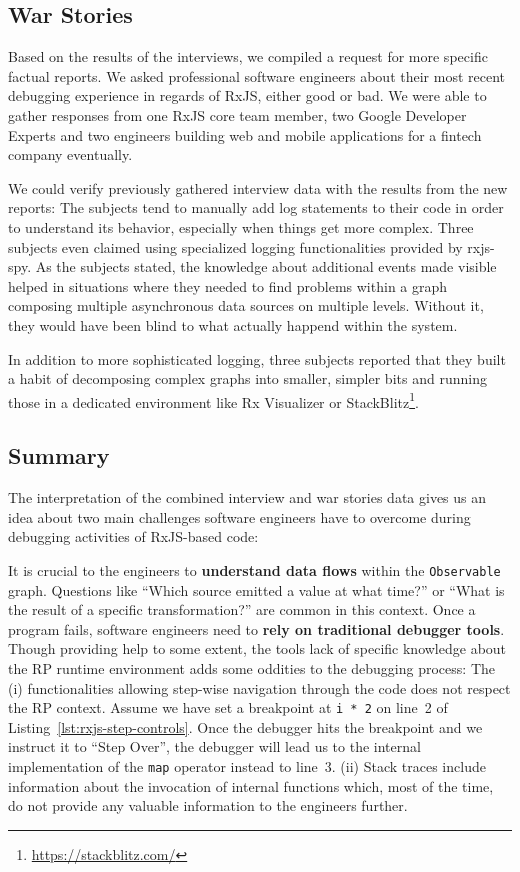 \documentclass[12pt,a4paper]{article}
\begin{document}
\subsection{War Stories}

Based on the results of the interviews, we compiled a request for more specific factual reports. We asked professional software engineers about their most recent debugging experience in regards of RxJS, either good or bad. We were able to gather responses from one RxJS core team member, two Google Developer Experts and two engineers building web and mobile applications for a fintech company eventually.

We could verify previously gathered interview data with the results from the new reports: The subjects tend to manually add log statements to their code in order to understand its behavior, especially when things get more complex. Three subjects even claimed using specialized logging functionalities provided by rxjs-spy\cite{rxjsspy}. As the subjects stated, the knowledge about additional events made visible helped in situations where they needed to find problems within a graph composing multiple asynchronous data sources on multiple levels. Without it, they would have been blind to what actually happend within the system.

In addition to more sophisticated logging, three subjects reported that they built a habit of decomposing complex graphs into smaller, simpler bits and running those in a dedicated environment like Rx Visualizer\cite{rxviz} or StackBlitz\footnote{\url{https://stackblitz.com/}}.

\subsection{Summary}

The interpretation of the combined interview and war stories data gives us an idea about two main challenges software engineers have to overcome during debugging activities of RxJS-based code:

It is crucial to the engineers to \textbf{understand data flows}  within the \texttt{Observable} graph. Questions like ``Which source emitted a value at what time?'' or ``What is the result of a specific transformation?'' are common in this context. Once a program fails, software engineers need to \textbf{rely on traditional debugger tools}. Though providing help to some extent, the tools lack of specific knowledge about the RP runtime environment adds some oddities to the debugging process: The (i) functionalities allowing step-wise navigation through the code does not respect the RP context. Assume we have set a breakpoint at \texttt{i * 2} on line~2 of Listing~\ref{lst:rxjs-step-controls}. Once the debugger hits the breakpoint and we instruct it to ``Step Over'', the debugger will lead us to the internal implementation of the \texttt{map} operator instead to line~3. (ii) Stack traces include information about the invocation of internal functions which, most of the time, do not provide any valuable information to the engineers further.
\end{document}
